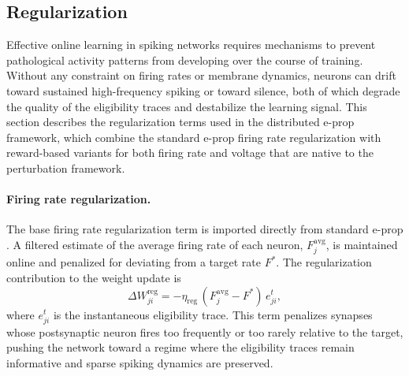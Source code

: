     \subsection{Regularization}
    \label{subsec:regularization}
    
    Effective online learning in spiking networks requires mechanisms to prevent
    pathological activity patterns from developing over the course of training. Without
    any constraint on firing rates or membrane dynamics, neurons can drift toward sustained
    high-frequency spiking or toward silence, both of which degrade the quality of the
    eligibility traces and destabilize the learning signal. This section describes the
    regularization terms used in the distributed e-prop framework, which combine the
    standard e-prop firing rate regularization with reward-based variants for both firing
    rate and voltage that are native to the perturbation framework.
    
    \paragraph{Firing rate regularization.}
    
    The base firing rate regularization term is imported directly from standard e-prop
    \cite{eprop2020}. A filtered estimate of the average firing rate of each neuron,
    $F_j^{\mathrm{avg}}$, is maintained online and penalized for deviating from a target
    rate $F^*$. The regularization contribution to the weight update is
    \[
        \Delta W_{ji}^{\mathrm{reg}} = -\eta_{\mathrm{reg}}\,
        (F_j^{\mathrm{avg}} - F^*)\, e_{ji}^t,
    \]
    where $e_{ji}^t$ is the instantaneous eligibility trace. This term penalizes synapses
    whose postsynaptic neuron fires too frequently or too rarely relative to the target,
    pushing the network toward a regime where the eligibility traces remain informative and
    sparse spiking dynamics are preserved.
    
